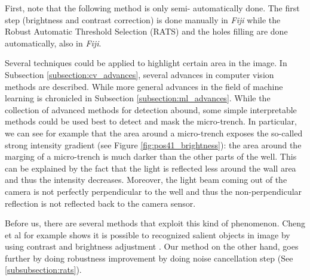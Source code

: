 \documentclass[pdftex,12pt,a4paper]{report}
\begin{document}
First, note that the following method is only semi- automatically done. The first step (brightness and contrast correction) is done manually in \textit{Fiji} while the Robust Automatic Threshold Selection (RATS) and the holes filling are done automatically, also in \textit{Fiji}.

Several techniques could be applied to highlight certain area in the image. In Subsection \ref{subsection:cv_advances}, several advances in computer vision methods are described. While more general advances in the field of machine learning is chronicled in Subsection \ref{subsection:ml_advances}. While the collection of advanced methods for detection abound, some simple interpretable methods could be used best to detect and mask the micro-trench. In particular,  we can see for example that the area around a micro-trench exposes the so-called strong intensity gradient (see Figure \ref{fig:pos41_brightness}): the area around the marging of a micro-trench is much darker than the other parts of the well. This can be explained by the fact that the light is reflected less around the wall area and thus the intensity decreases. Moreover, the light beam coming out of the camera is not perfectly perpendicular to the well and thus the non-perpendicular reflection is not reflected back to the camera sensor.

Before us, there are several methods that exploit this kind of phenomenon. Cheng et al for example shows it is possible to recognized salient objects in image by using contrast and brightness adjustment \cite{cheng2015global}. Our method on the other hand, goes further by doing robustness improvement by doing noise cancellation step (See \ref{subsubsection:rats}).
\end{document}
